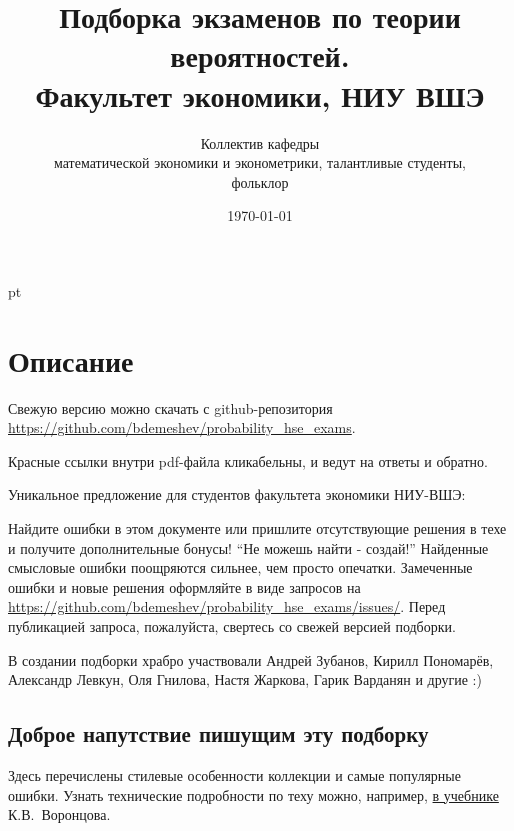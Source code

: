\documentclass[11pt, a4paper]{article}
\title{Подборка экзаменов по теории вероятностей. \\Факультет экономики, НИУ ВШЭ}
\date{\today}
\author{Коллектив кафедры \\
математической экономики и эконометрики,
талантливые студенты,\\
 фольклор}
\begin{document}
\maketitle

\tableofcontents{}


 pt %

\clearpage
\section*{Описание}

Свежую версию можно скачать с github-репозитория \url{https://github.com/bdemeshev/probability_hse_exams}.

Красные ссылки внутри pdf-файла кликабельны, и ведут на ответы и обратно.


Уникальное предложение для студентов факультета экономики НИУ-ВШЭ:

Найдите ошибки в этом документе или пришлите отсутствующие решения в техе и получите
дополнительные бонусы! “Не можешь найти - создай!”
Найденные смысловые ошибки поощряются сильнее, чем просто опечатки.
Замеченные ошибки и новые решения оформляйте в виде запросов на
\url{https://github.com/bdemeshev/probability_hse_exams/issues/}.
Перед публикацией запроса, пожалуйста, свертесь со свежей версией подборки.

В создании подборки храбро участвовали
Андрей Зубанов, Кирилл Пономарёв, Александр Левкун, Оля Гнилова,
Настя Жаркова, Гарик Варданян и другие :)


\subsection*{Доброе напутствие пишущим эту подборку}

Здесь перечислены стилевые особенности коллекции и самые популярные ошибки.
Узнать технические подробности по теху можно, например,
\href{http://www.ccas.ru/voron/download/voron05latex.pdf}{в учебнике} К.В. Воронцова.
\end{document}
